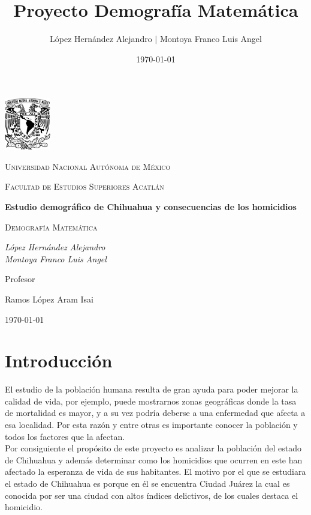 \documentclass[fontsize=11pt]{article}
\title{Proyecto Demografía Matemática}
\author{  López Hernández Alejandro $|$ Montoya Franco Luis Angel} %
\date{\normalsize\today} %
\begin{document}
\begin{titlepage}
	\centering
	\includegraphics[width=0.15\textwidth]{UNAM}\par\vspace{1cm}
	{\scshape\LARGE Universidad Nacional Autónoma de México\par}
	\vspace{1cm}
	{\scshape\Large Facultad de Estudios Superiores Acatlán\par}
	\vspace{1.5cm}
	{\huge\bfseries Estudio demográfico de Chihuahua y consecuencias de los homicidios  \par}
	\vspace{2cm}
	{\scshape\Large Demografía Matemática\par}
	\vspace{2cm}
	{\Large\itshape López Hernández Alejandro \\ Montoya Franco Luis Angel\par}
	\vfill
	Profesor\par
	Ramos López Aram Isai

	\vfill

	{\large \today\par}
\end{titlepage}

\section*{Introducción}
 El estudio de la población humana resulta de gran ayuda para poder mejorar la calidad de vida, por ejemplo, puede mostrarnos zonas geográficas donde la tasa de mortalidad es mayor, y a su vez podría deberse a una enfermedad que afecta a esa localidad. 
Por esta razón y entre otras es importante conocer la población y todos los factores que la afectan. 
\\Por consiguiente el propósito de este proyecto es analizar la población del estado de Chihuahua y además determinar como los homicidios que ocurren en este han afectado la esperanza de vida de sus habitantes.
El motivo por el que se estudiara el estado de Chihuahua es porque en él se encuentra Ciudad Juárez la cual es conocida por ser una ciudad con altos índices delictivos, de los cuales destaca el homicidio. 
\\ 
\end{document}
